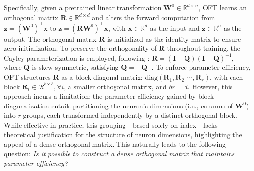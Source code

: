 Specifically, given a pretrained linear transformation $\bm{W}^0\in\mathbb{R}^{d\times n}$, OFT learns an orthogonal matrix $\bm{R}\in\mathbb{R}^{d\times d}$ and alters the forward computation from $\bm{z}=(\bm{W}^0)^\top\bm{x}$ to $\bm{z}=(\bm{R}\bm{W}^0)^\top\bm{x}$, with $\bm{x}\in\mathbb{R}^{d}$ as the input and $\bm{z}\in\mathbb{R}^{n}$ as the output. The orthogonal matrix $\bm{R}$ is initialized as the identity matrix to ensure zero initialization. To preserve the orthogonality of $\bm{R}$ throughout training, the Cayley parameterization is employed, following \cite{qiu2023controlling,liu2021orthogonal}: $\bm{R}=(\bm{I}+\bm{Q})(\bm{I}-\bm{Q})^{-1}$, where $\bm{Q}$ is skew-symmetric, satisfying $\bm{Q}=-\bm{Q}^\top$. To enforce parameter efficiency, OFT structures $\bm{R}$ as a block-diagonal matrix: $\text{diag}(\bm{R}_1,\bm{R}_2,\cdots,\bm{R}_r)$, with each block $\bm{R}_i\in\mathcal{R}^{b\times b}, \forall i$, a smaller orthogonal matrix, and $br = d$. However, this approach incurs a limitation: the parameter-efficiency gained by block-diagonalization entails partitioning the neuron's dimensions (i.e., columns of $\bm{W}^0$) into $r$ groups, each transformed independently by a distinct orthogonal block. While effective in practice, this grouping—based solely on index—lacks theoretical justification for the structure of neuron dimensions, highlighting the appeal of a dense orthogonal matrix. This naturally leads to the following question: \emph{Is it possible to construct a dense orthogonal matrix that maintains parameter efficiency?}

